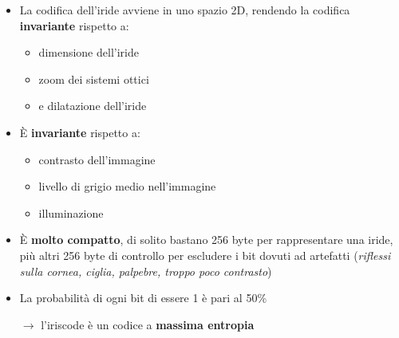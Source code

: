 \documentclass{report}
\begin{document}
\begin{itemize}
    \item La codifica dell'iride avviene in uno spazio 2D, rendendo la codifica \textbf{invariante}
    rispetto a:
    \begin{itemize}
        \item dimensione dell'iride
        \item zoom dei sistemi ottici
        \item e dilatazione dell'iride
    \end{itemize}
    \item È \textbf{invariante} rispetto a:
    \begin{itemize}
        \item contrasto dell'immagine 
        \item livello di grigio medio nell'immagine 
        \item illuminazione
    \end{itemize}
    \item È \textbf{molto compatto}, di solito bastano 256 byte per rappresentare una iride, più altri 
    256 byte di controllo per escludere i bit dovuti ad artefatti (\textit{riflessi sulla cornea, ciglia, palpebre, troppo poco contrasto})
    \item La probabilità di ogni bit di essere 1 è pari al 50\%
    
    $\rightarrow$ l'iriscode è un codice a \textbf{massima entropia}
\end{itemize}
\end{document}
